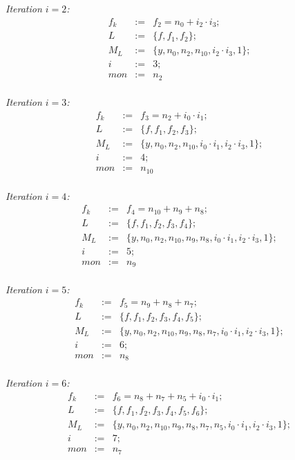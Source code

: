 \begin{Example}
	{\it Iteration $i=2$:}
	\begin{eqnarray}
		f_{k}&:=&f_{2}=n_0+i_2\cdot i_3; \nonumber \\
		L&:=&\{f,f_1,f_{2}\}; \nonumber \\
		M_{L}&:=&\{ y,n_0,n_2,n_{10},i_2 \cdot i_3,1\}; \nonumber \\
		i&:=&3;  \nonumber \\
		mon&:=& n_2\nonumber 
	\end{eqnarray}\\
	
	{\it Iteration $i=3$:}
	\begin{eqnarray}
		f_{k}&:=&f_{3}=n_2+i_0\cdot i_1; \nonumber \\
		L&:=&\{f,f_1,f_{2},f_{3}\}; \nonumber \\
		M_{L}&:=&\{ y,n_0,n_2,n_{10},i_0 \cdot i_1,i_2 \cdot i_3,1\}; \nonumber \\
		i&:=&4;  \nonumber \\
		mon&:=& n_{10}\nonumber 
	\end{eqnarray}\\

	{\it Iteration $i=4$:}
	\begin{eqnarray}
		f_{k}&:=&f_{4}=n_{10}+n_9+n_8; \nonumber \\
		L&:=&\{f,f_1,f_{2},f_{3},f_{4}\}; \nonumber \\
		M_{L}&:=&\{ y,n_0,n_2,n_{10},n_9,n_8,i_0\cdot i_1,i_2\cdot i_3,1\}; \nonumber \\
		i&:=&5;  \nonumber \\
		mon&:=& n_9\nonumber 
	\end{eqnarray}\\
	
	{\it Iteration $i=5$:}
	\begin{eqnarray}
		f_{k}&:=&f_{5}=n_9+n_8+n_7; \nonumber \\
		L&:=&\{f,f_1,f_{2},f_{3},f_{4},f_{5}\}; \nonumber \\
		M_{L}&:=&\{ y,n_0,n_2,n_{10},n_9,n_8,n_7,i_0\cdot i_1,i_2\cdot i_3,1\}; \nonumber \\
		i&:=&6;  \nonumber \\
		mon&:=& n_8\nonumber 
	\end{eqnarray}\\

	{\it Iteration $i=6$:}
	\begin{eqnarray}
		f_{k}&:=&f_{6}=n_8+n_7+n_5+i_0\cdot i_1; \nonumber \\
		L&:=&\{ f,f_1,f_{2},f_{3},f_{4},f_{5},f_{6}\}; \nonumber \\
		M_{L}&:=&\{ y,n_0,n_2,n_{10},n_9,n_8,n_7,n_5,i_0\cdot i_1,i_2\cdot i_3,1\}; \nonumber \\
		i&:=&7;  \nonumber \\
		mon&:=& n_7\nonumber 
	\end{eqnarray}\\
	

\end{Example}
